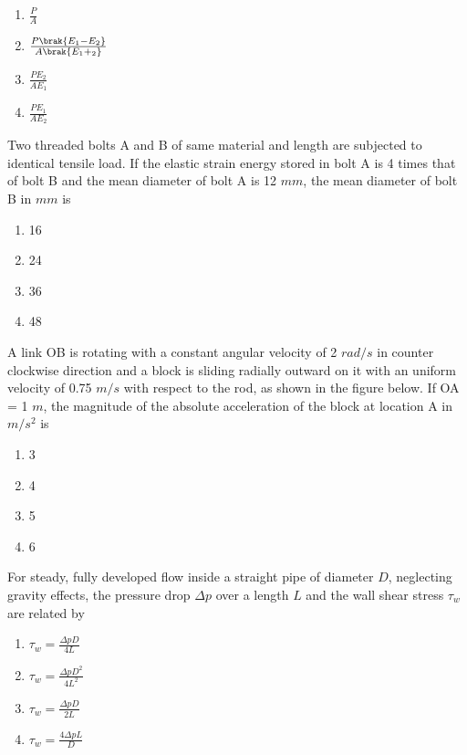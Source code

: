 \begin{figure}[!ht]
\centering
\resizebox{0.5\textwidth}{!}{%

}%
\end{figure}
 \begin{enumerate}
     \item $\frac{P}{A}$
     \item $\frac{P\brak{E_1-E_2}}{A\brak{E_1+_2}}$
     \item $\frac{PE_2}{AE_1}$
     \item $\frac{PE_1}{AE_2}$ \\
 \end{enumerate}
\item Two threaded bolts A and B of same material and length are subjected to identical tensile load. If the elastic strain energy stored in bolt A is 4 times that of bolt B and the mean diameter of bolt A is 12 $mm$, the mean diameter of bolt B in $mm$ is 
\begin{enumerate}
   \item 16
   \item 24
   \item 36
   \item 48 \\
\end{enumerate}
\item A link OB is rotating with a constant angular velocity of 2 $rad/s$ in counter clockwise direction and a block is sliding radially outward on it with an uniform velocity of 0.75 $m/s$ with respect to the rod, as shown in the figure below. If OA = 1 $m$, the magnitude of the absolute acceleration of the
block at location A in $m/s^2$ is 
\begin{figure}[!ht]
\centering
\resizebox{0.25\textwidth}{!}{%

}%
\end{figure}
\begin{enumerate}
    \item 3
    \item 4
    \item 5
    \item 6 \\
\end{enumerate}
\item For steady, fully developed flow inside a straight pipe of diameter $D$, neglecting gravity effects, the pressure drop $\Delta p$ over a length $L$ and the wall shear stress $\tau_w$ are related by 
\begin{enumerate}
    \item $\tau_w = \frac{\Delta pD}{4L}$
    \item $\tau_w = \frac{\Delta pD^2}{4L^2}$
    \item $\tau_w = \frac{\Delta pD}{2L}$
    \item $\tau_w = \frac{4\Delta pL}{D}$ \\
 \end{enumerate}
